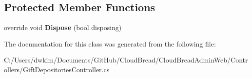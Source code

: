 \subsection*{Protected Member Functions}
\begin{DoxyCompactItemize}
\item 
override void {\bfseries Dispose} (bool disposing)\hypertarget{class_cloud_bread_admin_web_1_1_controllers_1_1_gift_depositories_controller_a1e31b97188c2acb720bc826db28a93e7}{}\label{class_cloud_bread_admin_web_1_1_controllers_1_1_gift_depositories_controller_a1e31b97188c2acb720bc826db28a93e7}

\end{DoxyCompactItemize}


The documentation for this class was generated from the following file\+:\begin{DoxyCompactItemize}
\item 
C\+:/\+Users/dwkim/\+Documents/\+Git\+Hub/\+Cloud\+Bread/\+Cloud\+Bread\+Admin\+Web/\+Controllers/Gift\+Depositories\+Controller.\+cs\end{DoxyCompactItemize}
